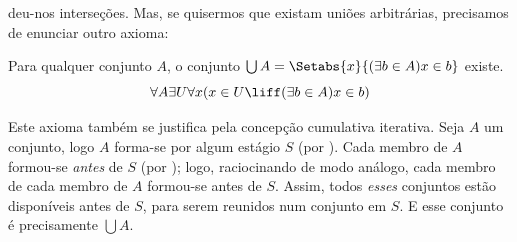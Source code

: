 \documentclass[../../../include/open-logic-section]{subfiles}
\begin{document}

 deu-nos interseções.
Mas, se quisermos que existam uniões arbitrárias, precisamos de enunciar outro
axioma:

\begin{axiom}[União] Para qualquer conjunto $A$, o conjunto $\bigcup A =
\Setabs{x}{(\exists b \in A) x \in b}$ existe.
\[
	\forall A \exists U \forall x(x \in U \liff (\exists b \in A)x \in b)
\]
\end{axiom}

Este axioma também se justifica pela concepção cumulativa iterativa.
Seja $A$ um conjunto, logo $A$ forma-se por algum estágio $S$ (por \stageshier).
Cada membro de $A$ formou-se \emph{antes} de $S$ (por \stagesacc); logo,
raciocinando de modo análogo, cada membro de cada membro de $A$ formou-se
antes de $S$. Assim, todos \emph{esses} conjuntos estão disponíveis antes de $S$, para
serem reunidos num conjunto em $S$. E esse conjunto é precisamente $\bigcup A$.
\end{document}
